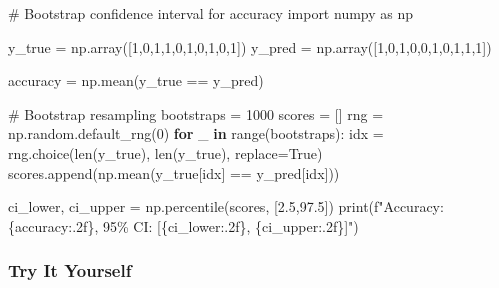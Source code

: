 \documentclass[
  letterpaper,
  DIV=11,
  numbers=noendperiod]{scrreprt}
\newenvironment{Shaded}{\begin{snugshade}}{\end{snugshade}}
\newcommand{\BuiltInTok}[1]{\textcolor[rgb]{0.00,0.23,0.31}{#1}}
\newcommand{\CommentTok}[1]{\textcolor[rgb]{0.37,0.37,0.37}{#1}}
\newcommand{\ControlFlowTok}[1]{\textcolor[rgb]{0.00,0.23,0.31}{\textbf{#1}}}
\newcommand{\DecValTok}[1]{\textcolor[rgb]{0.68,0.00,0.00}{#1}}
\newcommand{\FloatTok}[1]{\textcolor[rgb]{0.68,0.00,0.00}{#1}}
\newcommand{\ImportTok}[1]{\textcolor[rgb]{0.00,0.46,0.62}{#1}}
\newcommand{\KeywordTok}[1]{\textcolor[rgb]{0.00,0.23,0.31}{\textbf{#1}}}
\newcommand{\NormalTok}[1]{\textcolor[rgb]{0.00,0.23,0.31}{#1}}
\newcommand{\OperatorTok}[1]{\textcolor[rgb]{0.37,0.37,0.37}{#1}}
\newcommand{\SpecialCharTok}[1]{\textcolor[rgb]{0.37,0.37,0.37}{#1}}
\newcommand{\SpecialStringTok}[1]{\textcolor[rgb]{0.13,0.47,0.30}{#1}}
\newcommand{\VariableTok}[1]{\textcolor[rgb]{0.07,0.07,0.07}{#1}}
\begin{document}
\begin{Shaded}
\begin{Highlighting}[]
\CommentTok{\# Bootstrap confidence interval for accuracy}
\ImportTok{import}\NormalTok{ numpy }\ImportTok{as}\NormalTok{ np}

\NormalTok{y\_true }\OperatorTok{=}\NormalTok{ np.array([}\DecValTok{1}\NormalTok{,}\DecValTok{0}\NormalTok{,}\DecValTok{1}\NormalTok{,}\DecValTok{1}\NormalTok{,}\DecValTok{0}\NormalTok{,}\DecValTok{1}\NormalTok{,}\DecValTok{0}\NormalTok{,}\DecValTok{1}\NormalTok{,}\DecValTok{0}\NormalTok{,}\DecValTok{1}\NormalTok{])}
\NormalTok{y\_pred }\OperatorTok{=}\NormalTok{ np.array([}\DecValTok{1}\NormalTok{,}\DecValTok{0}\NormalTok{,}\DecValTok{1}\NormalTok{,}\DecValTok{0}\NormalTok{,}\DecValTok{0}\NormalTok{,}\DecValTok{1}\NormalTok{,}\DecValTok{0}\NormalTok{,}\DecValTok{1}\NormalTok{,}\DecValTok{1}\NormalTok{,}\DecValTok{1}\NormalTok{])}

\NormalTok{accuracy }\OperatorTok{=}\NormalTok{ np.mean(y\_true }\OperatorTok{==}\NormalTok{ y\_pred)}

\CommentTok{\# Bootstrap resampling}
\NormalTok{bootstraps }\OperatorTok{=} \DecValTok{1000}
\NormalTok{scores }\OperatorTok{=}\NormalTok{ []}
\NormalTok{rng }\OperatorTok{=}\NormalTok{ np.random.default\_rng(}\DecValTok{0}\NormalTok{)}
\ControlFlowTok{for}\NormalTok{ \_ }\KeywordTok{in} \BuiltInTok{range}\NormalTok{(bootstraps):}
\NormalTok{    idx }\OperatorTok{=}\NormalTok{ rng.choice(}\BuiltInTok{len}\NormalTok{(y\_true), }\BuiltInTok{len}\NormalTok{(y\_true), replace}\OperatorTok{=}\VariableTok{True}\NormalTok{)}
\NormalTok{    scores.append(np.mean(y\_true[idx] }\OperatorTok{==}\NormalTok{ y\_pred[idx]))}

\NormalTok{ci\_lower, ci\_upper }\OperatorTok{=}\NormalTok{ np.percentile(scores, [}\FloatTok{2.5}\NormalTok{,}\FloatTok{97.5}\NormalTok{])}
\BuiltInTok{print}\NormalTok{(}\SpecialStringTok{f"Accuracy: }\SpecialCharTok{\{}\NormalTok{accuracy}\SpecialCharTok{:.2f\}}\SpecialStringTok{, 95\% CI: [}\SpecialCharTok{\{}\NormalTok{ci\_lower}\SpecialCharTok{:.2f\}}\SpecialStringTok{, }\SpecialCharTok{\{}\NormalTok{ci\_upper}\SpecialCharTok{:.2f\}}\SpecialStringTok{]"}\NormalTok{)}
\end{Highlighting}
\end{Shaded}

\subsubsection{Try It Yourself}\label{try-it-yourself-84}
\end{document}
